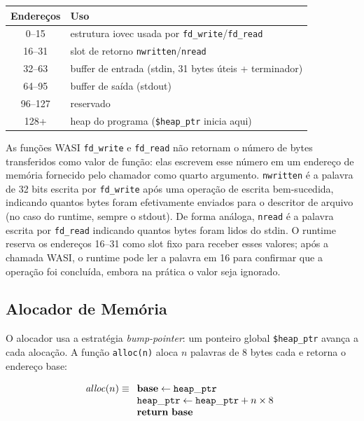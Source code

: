 \begin{center}
  \begin{tabular}{cl}
    \hline
    \textbf{Endereços} & \textbf{Uso} \\
    \hline
    0–15   & estrutura iovec usada por \texttt{fd\_write}/\texttt{fd\_read} \\
    16–31  & slot de retorno \texttt{nwritten}/\texttt{nread} \\
    32–63  & buffer de entrada (stdin, 31 bytes úteis + terminador) \\
    64–95  & buffer de saída (stdout) \\
    96–127 & reservado \\
    128+   & heap do programa (\texttt{\$heap\_ptr} inicia aqui) \\
    \hline
  \end{tabular}
\end{center}

As funções WASI \texttt{fd\_write} e \texttt{fd\_read} não retornam o número
de bytes transferidos como valor de função: elas escrevem esse número em um
endereço de memória fornecido pelo chamador como quarto argumento.
\texttt{nwritten} é a palavra de 32 bits escrita por \texttt{fd\_write} após
uma operação de escrita bem-sucedida, indicando quantos bytes foram
efetivamente enviados para o descritor de arquivo (no caso do runtime,
sempre o stdout).  De forma análoga, \texttt{nread} é a palavra escrita por
\texttt{fd\_read} indicando quantos bytes foram lidos do stdin.  O runtime
reserva os endereços 16–31 como slot fixo para receber esses valores; após
a chamada WASI, o runtime pode ler a palavra em 16 para confirmar que a
operação foi concluída, embora na prática o valor seja ignorado.

\subsection{Alocador de Memória}\label{subsec:alloc}

O alocador usa a estratégia \emph{bump-pointer}: um ponteiro global
\texttt{\$heap\_ptr} avança a cada alocação.  A função \texttt{alloc(n)}
aloca $n$ palavras de 8 bytes cada e retorna o endereço base:

\[
  \mathit{alloc}(n) \equiv
  \begin{array}[t]{l}
    \mathbf{base} \leftarrow \mathtt{heap\_ptr} \\
    \mathtt{heap\_ptr} \leftarrow \mathtt{heap\_ptr} + n \times 8 \\
    \mathbf{return}\ \mathbf{base}
  \end{array}
\]

